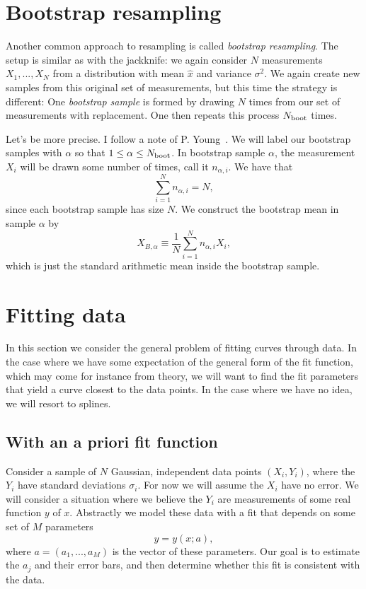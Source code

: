 \section{Bootstrap resampling}

Another common approach to resampling is called {\it bootstrap resampling}.
The setup is similar as with the jackknife: we again consider
$N$ measurements $X_1,...,X_N$ from a distribution with mean
$\hat{x}$ and variance $\sigma^2$. We again create new samples from
this original set of measurements, but this time the strategy is different:
One {\it bootstrap sample} is formed by drawing $N$ times from our set
of measurements with replacement. One then repeats this process
$N_{\text{boot}}$ times.

Let's be more precise. I follow a note of P. Young~\cite{youngBootstrap}.
We will label our bootstrap samples with $\alpha$ so that
$1\leq\alpha\leq N_{\text{boot}}$. In bootstrap sample $\alpha$, the measurement
$X_i$ will be drawn some number of times, call it $n_{\alpha,i}$.
We have that
\begin{equation}
\sum_{i=1}^Nn_{\alpha,i}=N,
\end{equation}
since each bootstrap sample has size $N$. We construct the bootstrap mean in
sample $\alpha$ by
\begin{equation}
X_{B,\alpha}\equiv\frac{1}{N}\sum_{i=1}^Nn_{\alpha,i}X_i,
\end{equation}
which is just the standard arithmetic mean inside the bootstrap sample.


\section{Fitting data}

In this section we consider the general problem of fitting curves through data.
In the case where we have some expectation of the general form of the fit
function, which may come for instance from theory, we will want to find the fit
parameters that yield a curve closest to the data points. In the case where we
have no idea, we will resort to splines.

\subsection{With an a priori fit function}\label{sec:fitchi2}

Consider a sample of $N$ Gaussian, independent data points $(X_i,Y_i)$,
where the $Y_i$ have standard deviations $\sigma_i$. For now we will
assume the $X_i$ have no error. We will consider a situation where
we believe the $Y_i$ are measurements of some real function $y$ of $x$.
Abstractly we model these data with a fit that depends on some set
of $M$ parameters
\begin{equation}
  y=y(x;a),
\end{equation}
where $a=(a_1,...,a_M)$ is the vector of these parameters. Our goal
is to estimate the $a_j$ and their error bars, and then determine whether
this fit is consistent with the data.

